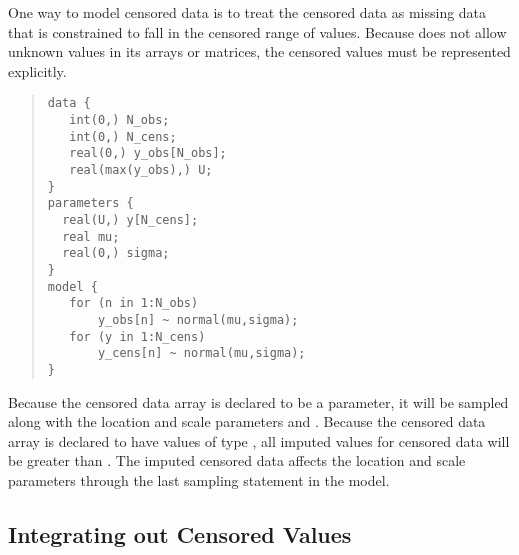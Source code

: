 One way to model censored data is to treat the censored data as
missing data that is constrained to fall in the censored range of
values.  Because \Stan does not allow unknown values in its arrays or
matrices, the censored values must be represented explicitly.
%
\begin{quote}
\begin{Verbatim}
data {
   int(0,) N_obs;
   int(0,) N_cens;
   real(0,) y_obs[N_obs];
   real(max(y_obs),) U;
}
parameters {
  real(U,) y[N_cens];
  real mu;
  real(0,) sigma;
}
model {
   for (n in 1:N_obs)
       y_obs[n] ~ normal(mu,sigma);
   for (y in 1:N_cens)
       y_cens[n] ~ normal(mu,sigma);
}
\end{Verbatim}
\end{quote}
%
Because the censored data array  is declared to be a parameter, it
will be sampled along with the location and scale parameters 
and .  Because the censored data array  is
declared to have values of type , all imputed values
for censored data will be greater than .  The imputed censored
data affects the location and scale parameters through the last
sampling statement in the model.  

\subsection{Integrating out Censored Values}


